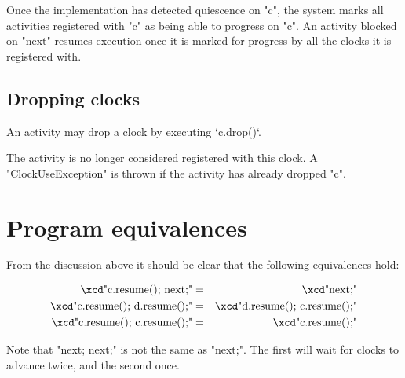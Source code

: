 Once the implementation has detected quiescence on \xcd"c", the system
marks all activities registered with \xcd"c" as being able to progress
on \xcd"c". An activity blocked on \xcd"next" resumes execution once
it is marked for progress by all the clocks it is registered with.

\subsection{Dropping clocks}\label{sec:clock:drop}
An activity may drop a clock by executing \xcd`c.drop()`.



\noindent{} The activity is no longer considered registered with this
clock.  A \xcd"ClockUseException" is thrown if the activity has
already dropped \xcd"c".


%

\section{Program equivalences}
From the discussion above it should be clear that the following
equivalences hold:

\begin{eqnarray}
 \mbox{\xcd"c.resume(); next;"}       &=& \mbox{\xcd"next;"}\\
 \mbox{\xcd"c.resume(); d.resume();"} &=& \mbox{\xcd"d.resume(); c.resume();"}\\
 \mbox{\xcd"c.resume(); c.resume();"} &=& \mbox{\xcd"c.resume();"}
\end{eqnarray}

Note that \xcd"next; next;" is not the same as \xcd"next;". The
first will wait for clocks to advance twice, and the second
once.  


